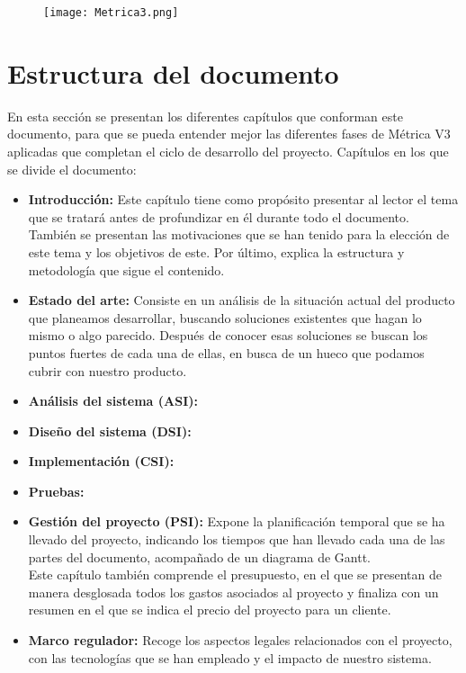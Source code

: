 \begin{figure}[H]
	{\texttt{[image: Metrica3.png]}}
\end{figure}

\section{Estructura del documento}
En esta sección se presentan los diferentes capítulos que conforman este documento, para que se pueda entender mejor las diferentes fases de Métrica V3 aplicadas que completan el ciclo de desarrollo del proyecto. Capítulos en los que se divide el documento:

\begin{itemize}
    \item \textbf{Introducción:} Este capítulo tiene como propósito presentar al lector el tema que se tratará antes de profundizar en él durante todo el documento. También se presentan las motivaciones que se han tenido para la elección de este tema y los objetivos de este. Por último, explica la estructura y metodología que sigue el contenido. 
    \item \textbf{Estado del arte:} Consiste en un análisis de la situación actual del producto que planeamos desarrollar, buscando soluciones existentes que hagan lo mismo o algo parecido. Después de conocer esas soluciones se buscan los puntos fuertes de cada una de ellas, en busca de un hueco que podamos cubrir con nuestro producto.
    \item \textbf{Análisis del sistema (ASI):}
    \item \textbf{Diseño del sistema (DSI):}
    \item \textbf{Implementación (CSI):}
    \item \textbf{Pruebas:}
    \item \textbf{Gestión del proyecto (PSI):} Expone la planificación temporal que se ha llevado del proyecto, indicando los tiempos que han llevado cada una de las partes del documento, acompañado de un diagrama de Gantt. \\ Este capítulo también comprende el presupuesto, en el que se presentan de manera desglosada todos los gastos asociados al proyecto y finaliza con un resumen en el que se indica el precio del proyecto para un cliente.
    \item \textbf{Marco regulador:} Recoge los aspectos legales relacionados con el proyecto, con las tecnologías que se han empleado y el impacto de nuestro sistema.

\end{itemize}
